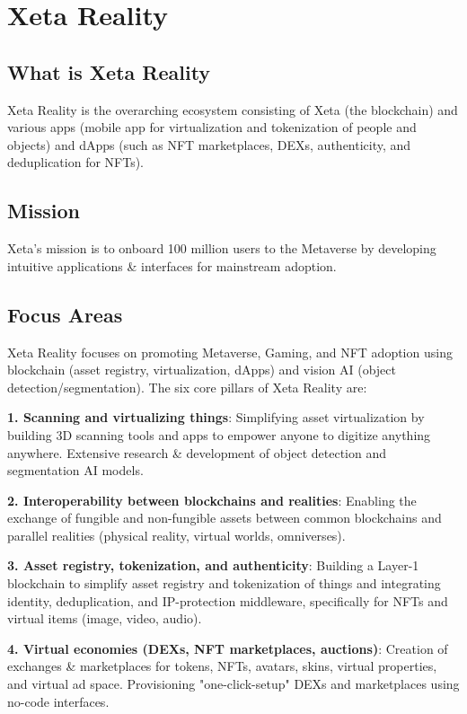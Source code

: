 \documentclass{article}
\begin{document}
\section{Xeta Reality}
\subsection{What is Xeta Reality}
Xeta Reality is the overarching ecosystem consisting of Xeta (the blockchain) and various apps (mobile app for virtualization and tokenization of people and objects) and dApps (such as NFT marketplaces, DEXs, authenticity, and deduplication for NFTs).

\subsection{Mission}
Xeta's mission is to onboard 100 million users to the Metaverse by developing intuitive applications \& interfaces for mainstream adoption.

\subsection{Focus Areas}
Xeta Reality focuses on promoting Metaverse, Gaming, and NFT adoption using blockchain (asset registry, virtualization, dApps) and vision AI (object detection/segmentation). The six core pillars of Xeta Reality are:
\bigskip

\textbf{1. Scanning and virtualizing things}: Simplifying asset virtualization by building 3D scanning tools and apps to empower anyone to digitize anything anywhere. Extensive research \& development of object detection and segmentation AI models.
\bigskip

\textbf{2. Interoperability between blockchains and realities}: Enabling the exchange of fungible and non-fungible assets between common blockchains and parallel realities (physical reality, virtual worlds, omniverses).
\bigskip

\textbf{3. Asset registry, tokenization, and authenticity}: Building a Layer-1 blockchain to simplify asset registry and tokenization of things and integrating identity, deduplication, and IP-protection middleware, specifically for NFTs and virtual items (image, video, audio).
\bigskip

\textbf{4. Virtual economies (DEXs, NFT marketplaces, auctions)}: Creation of exchanges \& marketplaces for tokens, NFTs, avatars, skins, virtual properties, and virtual ad space. Provisioning "one-click-setup" DEXs and marketplaces using no-code interfaces.
\bigskip
\end{document}
